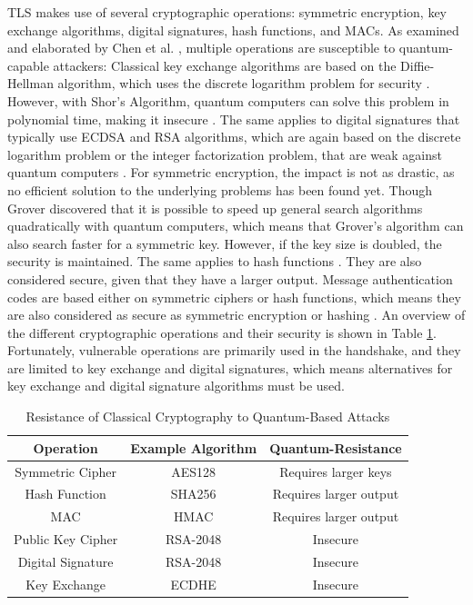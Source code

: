 \documentclass[public,noindent]{aisecreport}
\begin{document}
TLS makes use of several cryptographic operations: symmetric encryption, key exchange algorithms, digital signatures, hash functions, and MACs. As examined and elaborated by Chen et al. \cite{chen2016report}, multiple operations are susceptible to quantum-capable attackers:  Classical key exchange algorithms are based on the Diffie-Hellman algorithm, which uses the discrete logarithm problem for security \cite{maurer2000diffie}. However, with Shor's Algorithm, quantum computers can solve this problem in polynomial time, making it insecure \cite{shor1999polynomial}. The same applies to digital signatures that typically use ECDSA and RSA algorithms, which are again based on the discrete logarithm problem or the integer factorization problem, that are weak against quantum computers \cite{mahto2017rsa, shor1999polynomial}. For symmetric encryption, the impact is not as drastic, as no efficient solution to the underlying problems has been found yet. Though Grover \cite{grover1996fast} discovered that it is possible to speed up general search algorithms quadratically with quantum computers, which means that Grover's algorithm can also search faster for a symmetric key. However, if the key size is doubled, the security is maintained. The same applies to hash functions \cite{alnahawi2024comprehensive}. They are also considered secure, given that they have a larger output. Message authentication codes are based either on symmetric ciphers or hash functions, which means they are also considered as secure as symmetric encryption or hashing \cite{bhaumik2024committing}. An overview of the different cryptographic operations and their security is shown in Table \ref{tab:ops_security}. Fortunately, vulnerable operations are primarily used in the handshake, and they are limited to key exchange and digital signatures, which means alternatives for key exchange and digital signature algorithms must be used. 

\begin{table}[h]
    \centering
    \begin{tabular}{|c|c|c|}
        \hline
        \textbf{Operation} & \textbf{Example Algorithm} & \textbf{Quantum-Resistance} \\
        \hline
        Symmetric Cipher & AES128 & Requires larger keys \\
        Hash Function & SHA256 & Requires larger output  \\
        MAC & HMAC & Requires larger output \\
        \hline
        Public Key Cipher & RSA-2048 & Insecure \\
        Digital Signature & RSA-2048 & Insecure \\
        Key Exchange & ECDHE & Insecure \\
        \hline
    \end{tabular}
    \caption{Resistance of Classical Cryptography to Quantum-Based Attacks \cite{chen2016report}}
    \label{tab:ops_security}
\end{table}
\end{document}
